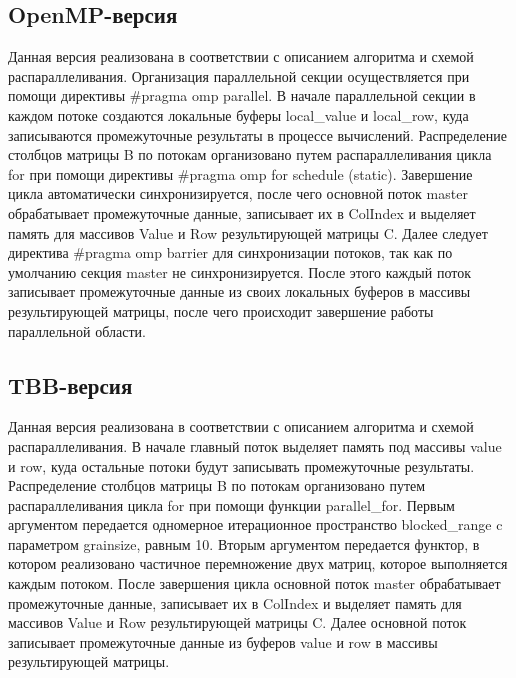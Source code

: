 \documentclass{report}
\begin{document}
\subsection*{OpenMP-версия}
\par Данная версия реализована в соответствии с описанием алгоритма и схемой распараллеливания. Организация параллельной секции осуществляется при помощи директивы \#pragma omp parallel. В начале параллельной секции в каждом потоке создаются локальные буферы local\_value и local\_row, куда записываются промежуточные результаты в процессе вычислений. Распределение столбцов матрицы B по потокам организовано путем распараллеливания цикла for при помощи директивы \#pragma omp for schedule (static). Завершение цикла автоматически синхронизируется, после чего основной поток master обрабатывает промежуточные данные, записывает их в ColIndex и выделяет память для массивов Value и Row результирующей матрицы C. Далее следует директива \#pragma omp barrier для синхронизации потоков, так как по умолчанию секция master не синхронизируется. После этого каждый поток записывает промежуточные данные из своих локальных буферов в массивы результирующей матрицы, после чего происходит завершение работы параллельной области.

\subsection*{TBB-версия}
\par Данная версия реализована в соответствии с описанием алгоритма и схемой распараллеливания. В начале главный поток выделяет память под массивы value и row, куда остальные потоки будут записывать промежуточные результаты. Распределение столбцов матрицы B по потокам организовано путем распараллеливания цикла for при помощи функции parallel\_for. Первым аргументом передается одномерное итерационное пространство blocked\_range c параметром grainsize, равным 10. Вторым аргументом передается функтор, в котором реализовано частичное перемножение двух матриц, которое выполняется каждым потоком. После завершения цикла основной поток master обрабатывает промежуточные данные, записывает их в ColIndex и выделяет память для массивов Value и Row результирующей матрицы C. Далее основной поток записывает промежуточные данные из буферов value и row в массивы результирующей матрицы.
\end{document}
